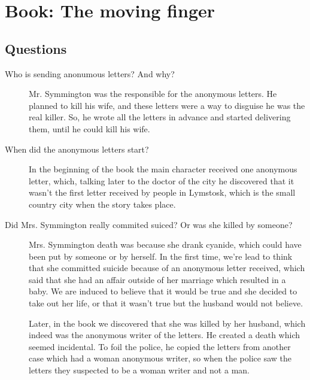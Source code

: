 \documentclass[a4paper,12pt]{article}
\begin{document}
\titleTMB 
\newpage
{} %


\section*{Book: The moving finger}
\subsection*{Questions}

\begin{description}

\item[Who is sending anonumous letters? And why?]
  {
    Mr. Symmington was the responsible  for the anonymous letters. He planned to
    kill his  wife, and these  letters were  a way to  disguise he was  the real
    killer. So, he wrote all the letters in advance and started delivering them, until he could kill his wife.
  }
  


  
\item[When did the anonymous letters start?]
  {
    In  the beginning  of the  book the  main character  received  one anonymous
    letter, which, talking later to the doctor of the city he discovered that it
    wasn't the first  letter received by people in Lymstosk,  which is the small
    country city when the story takes place.
  }
  
  
\item[Did Mrs. Symmington really commited suiced? Or was she killed by someone?]
  {
    Mrs. Symmington death  was because she drank cyanide,  which could have been
    put by someone  or by herself. In  the first time, we're lead  to think that
    she committed  suicide because of  an anonymous letter received,  which said
    that she had an affair outside of  her marriage which resulted in a baby. We
    are induced to believe that it would be true and she decided to take out her
    life, or that it wasn't true but the husband would not believe.

    Later, in the  book we discovered that she was killed  by her husband, which
    indeed was  the anonymous writer  of the letters.  He created a  death which
    seemed incidental.  To foil the police,  he copied the  letters from another
    case which had a woman anonymous writer, so when the police saw the letters
    they suspected to be a woman writer and not a man.

}
\end{description}
\end{document}
